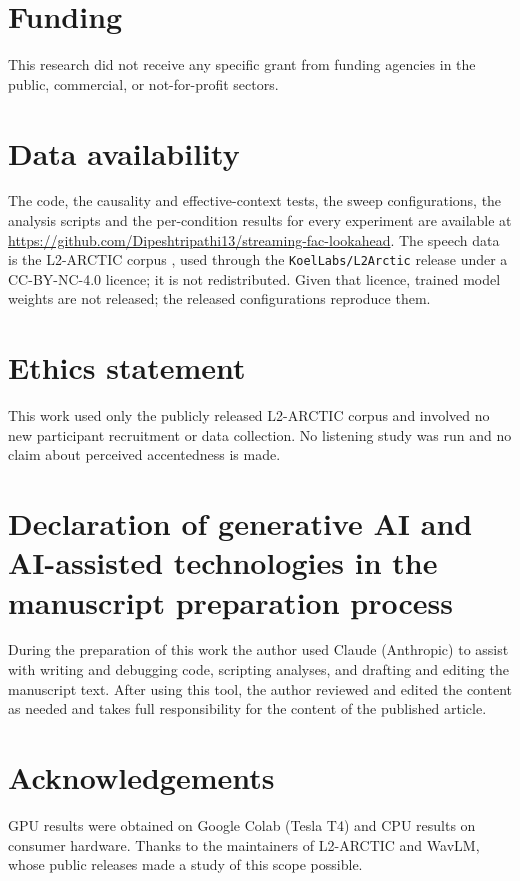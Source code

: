 \documentclass[preprint,12pt,authoryear]{elsarticle}
\begin{document}
\section*{Funding}

This research did not receive any specific grant from funding agencies in the
public, commercial, or not-for-profit sectors.

\section*{Data availability}

The code, the causality and effective-context tests, the sweep
configurations, the analysis scripts and the per-condition results for every
experiment are available at
\url{https://github.com/Dipeshtripathi13/streaming-fac-lookahead}. The speech
data is the L2-ARCTIC corpus \citep{l2arctic2018}, used through the
\texttt{KoelLabs/L2Arctic} release under a CC-BY-NC-4.0 licence; it is not
redistributed. Given that licence, trained model weights are not released;
the released configurations reproduce them.

\section*{Ethics statement}

This work used only the publicly released L2-ARCTIC corpus and involved no
new participant recruitment or data collection. No listening study was run
and no claim about perceived accentedness is made.

\section*{Declaration of generative AI and AI-assisted technologies in the manuscript preparation process}

During the preparation of this work the author used Claude (Anthropic) to
assist with writing and debugging code, scripting analyses, and drafting and
editing the manuscript text. After using this tool, the author reviewed and
edited the content as needed and takes full responsibility for the content of
the published article.

\section*{Acknowledgements}

GPU results were obtained on Google Colab (Tesla T4) and CPU results on
consumer hardware. Thanks to the maintainers of L2-ARCTIC and WavLM, whose
public releases made a study of this scope possible.



\end{document}
